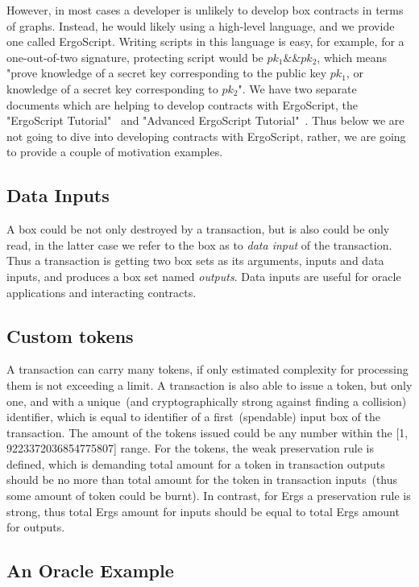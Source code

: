  However, in most cases a developer is unlikely to develop box contracts in terms of graphs. Instead, he would likely
 using a high-level language, and we provide one called ErgoScript. Writing scripts in this language is easy, for
 example, for a one-out-of-two signature, protecting script would be ${pk_1 \&\& pk_2}$, which means "prove knowledge of
 a secret key corresponding to the public key $pk_1$, or knowledge of a secret key corresponding to $pk_2$". We have
 two separate documents which are helping to develop contracts with ErgoScript, the "ErgoScript Tutorial"~\cite{}
 and "Advanced ErgoScript Tutorial"~\cite{}. Thus below we are not going to dive into developing contracts with
 ErgoScript, rather, we are going to provide a couple of motivation examples.

\subsection{Data Inputs}
 \label{sec:data-inputs}

 A box could be not only destroyed by a transaction, but is also could be only read, in the latter case we refer to the
 box as to {\em data input} of the transaction. Thus a transaction is getting two box sets as its arguments, inputs and
 data inputs, and produces a box set named {\em outputs}. Data inputs are useful for oracle applications and interacting
 contracts.

\subsection{Custom tokens}
 \label{sec:custom tokens}

 A transaction can carry many tokens, if only estimated complexity for processing them is not exceeding a limit. A
 transaction is also able to issue a token, but only one, and with a unique~(and cryptographically strong against
 finding a collision) identifier, which is equal to identifier of a first~(spendable) input box of the transaction.
 The amount of the tokens issued could be any number within the [1, 9223372036854775807] range. For the tokens, the weak
 preservation rule is defined, which is demanding total amount for a token in transaction outputs should be no more
 than total amount for the token in transaction inputs~(thus some amount of token could be burnt). In contrast, for Ergs
 a preservation rule is strong, thus total Ergs amount for inputs should be equal to total Ergs amount for outputs.

\subsection{An Oracle Example}
 \label{sec:platform}

